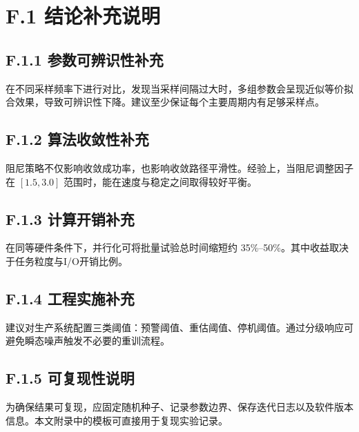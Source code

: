\section*{F.1 结论补充说明}
\subsection*{F.1.1 参数可辨识性补充}
在不同采样频率下进行对比，发现当采样间隔过大时，多组参数会呈现近似等价拟合效果，导致可辨识性下降。建议至少保证每个主要周期内有足够采样点。

\subsection*{F.1.2 算法收敛性补充}
阻尼策略不仅影响收敛成功率，也影响收敛路径平滑性。经验上，当阻尼调整因子在 $[1.5,3.0]$ 范围时，能在速度与稳定之间取得较好平衡。

\subsection*{F.1.3 计算开销补充}
在同等硬件条件下，并行化可将批量试验总时间缩短约 35\%--50\%。其中收益取决于任务粒度与I/O开销比例。

\subsection*{F.1.4 工程实施补充}
建议对生产系统配置三类阈值：预警阈值、重估阈值、停机阈值。通过分级响应可避免瞬态噪声触发不必要的重训流程。

\subsection*{F.1.5 可复现性说明}
为确保结果可复现，应固定随机种子、记录参数边界、保存迭代日志以及软件版本信息。本文附录中的模板可直接用于复现实验记录。
